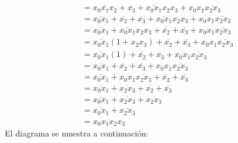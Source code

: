\documentclass[answers]{exam}
\begin{document}
\begin{questions}
\begin{solution}
\begin{itemize}
\begin{align*}
              &= \overline{x_{0}x_{1}x_{2}} + \overline{x_{3}}
                + \overline{x_{0}x_{1}}x_{2}x_{3} + x_{0}x_{1}\overline{x_{2}x_{3}}
                \tag{por Idempotencia} \\
              &= \overline{x_{0}x_{1}} + \overline{x_{2}}
                + \overline{x_{3}} + \overline{x_{0}x_{1}}x_{2}x_{3}
                + x_{0}x_{1}\overline{x_{2}x_{3}} \tag{por Leyes de Morgan} \\
              &= \overline{x_{0}x_{1}} + \overline{x_{0}x_{1}}x_{2}x_{3}
                + \overline{x_{2}} + \overline{x_{3}}
                + x_{0}x_{1}\overline{x_{2}x_{3}} \tag{por Asociatividad} \\
              &= \overline{x_{0}x_{1}}(1 + x_{2}x_{3})
                + \overline{x_{2}} + \overline{x_{3}}
                + x_{0}x_{1}\overline{x_{2}x_{3}} \tag{por Distributividad} \\
              &= \overline{x_{0}x_{1}}(1) + \overline{x_{2}}
                + \overline{x_{3}} + x_{0}x_{1}\overline{x_{2}x_{3}}
                \tag{por Aniquilación} \\
              &= \overline{x_{0}x_{1}} + \overline{x_{2}}
                + \overline{x_{3}} + x_{0}x_{1}\overline{x_{2}x_{3}}
                \tag{por Identidad} \\
              &= \overline{x_{0}x_{1}} + x_{0}x_{1}\overline{x_{2}x_{3}}
                + \overline{x_{2}} + \overline{x_{3}} \tag{por Asociatividad} \\
              &= \overline{x_{0}x_{1}} + \overline{x_{2}x_{3}}
                + \overline{x_{2}} + \overline{x_{3}} \tag{por Absorción} \\
              &= \overline{x_{0}x_{1}} + \overline{x_{2}x_{3}}
                + \overline{x_{2}x_{3}} \tag{por Leyes de Morgan} \\
              &= \overline{x_{0}x_{1}} + \overline{x_{2}x_{3}} \tag{por Idempotencia} \\
              &= \overline{x_{0}x_{1}x_{2}x_{3}} \tag{por Leyes de Morgan}
            \end{align*}
            El diagrama se muestra a continuación:
            \begin{center}

\end{center}
\end{itemize}
\end{solution}
\end{questions}
\end{document}
